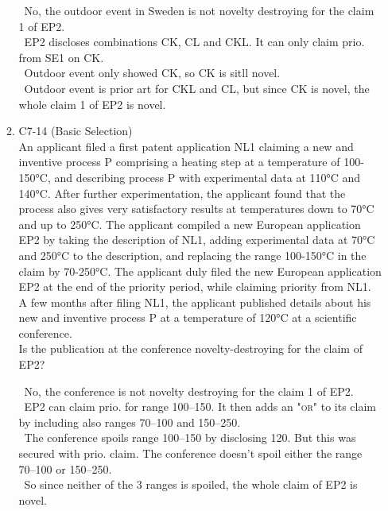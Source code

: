 \documentclass{report}
\newcommand{\p}{\adforn{61} \ }
\begin{document}
\begin{enumerate}[label=\textbf{Answer \arabic*}]
\begin{enumerate}[label=\textbf{Answer \arabic*}]
\p No, the outdoor event in Sweden is not novelty destroying for the claim 1 of \textsc{EP2}.  \\
\p \textsc{EP2} discloses combinations CK, CL and CKL. It can only claim prio. from \textsc{SE1} on CK. \\
\p Outdoor event only showed CK, so CK is sitll novel. \\
\p Outdoor event is prior art for CKL and CL, but since CK is novel, the whole claim 1 of \textsc{EP2} is novel.

    \item %
    C7-14 (Basic Selection) \\
    An applicant filed a first patent application NL1 claiming a new and inventive process P comprising a heating step at a temperature of 100-150°C, and describing process P with experimental data at 110°C and 140°C. After further experimentation, the applicant found that the process also gives very satisfactory results at temperatures down to 70°C and up to 250°C. The applicant compiled a new European application EP2 by taking the description of NL1, adding experimental data at 70°C and 250°C to the description, and replacing the range 100-150°C in the claim by 70-250°C. The applicant duly filed the new European application EP2 at the end of the priority period, while claiming priority from NL1. \\
    A few months after filing NL1, the applicant published details about his new and inventive process P at a temperature of 120°C at a scientific conference. \\
    Is the publication at the conference novelty-destroying for the claim of EP2?

\p No, the conference is not novelty destroying for the claim 1 of \textsc{EP2}.  \\
\p \textsc{EP2} can claim prio. for range 100--150. It then adds an "\textsc{or}" to its claim by including also ranges 70--100 and 150--250. \\
\p The conference spoils range 100--150 by disclosing 120. But this was secured with prio. claim. The conference doesn't spoil either the range 70--100 or 150--250. \\
\p So since neither of the 3 ranges is spoiled, the whole claim of \textsc{EP2} is novel. 


\end{enumerate}
\end{enumerate}
\end{document}
